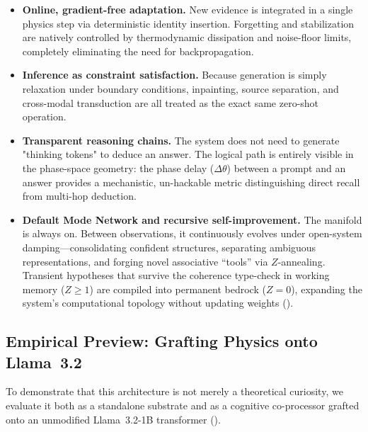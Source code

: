 \documentclass[11pt,a4paper]{article}
\begin{document}
\begin{itemize}[nosep]
  \item \textbf{Online, gradient-free adaptation.} New evidence is integrated in a single physics step via deterministic identity insertion. Forgetting and stabilization are natively controlled by thermodynamic dissipation and noise-floor limits, completely eliminating the need for backpropagation.
  \item \textbf{Inference as constraint satisfaction.} Because generation is simply relaxation under boundary conditions, inpainting, source separation, and cross-modal transduction are all treated as the exact same zero-shot operation.
  \item \textbf{Transparent reasoning chains.} The system does not need to generate "thinking tokens" to deduce an answer. The logical path is entirely visible in the phase-space geometry: the phase delay ($\Delta\theta$) between a prompt and an answer provides a mechanistic, un-hackable metric distinguishing direct recall from multi-hop deduction.
  \item \textbf{Default Mode Network and recursive self-improvement.} The manifold is always on. Between observations, it continuously evolves under open-system damping---consolidating confident structures, separating ambiguous representations, and forging novel associative ``tools'' via $Z$-annealing. Transient hypotheses that survive the coherence type-check in working memory ($Z \ge 1$) are compiled into permanent bedrock ($Z=0$), expanding the system's computational topology without updating weights ().
\end{itemize}

\subsection{Empirical Preview: Grafting Physics onto Llama~3.2}
\label{sec:practical_impact}
To demonstrate that this architecture is not merely a theoretical curiosity, we evaluate it both as a standalone substrate and as a cognitive co-processor grafted onto an unmodified Llama~3.2-1B transformer (). 
\end{document}
